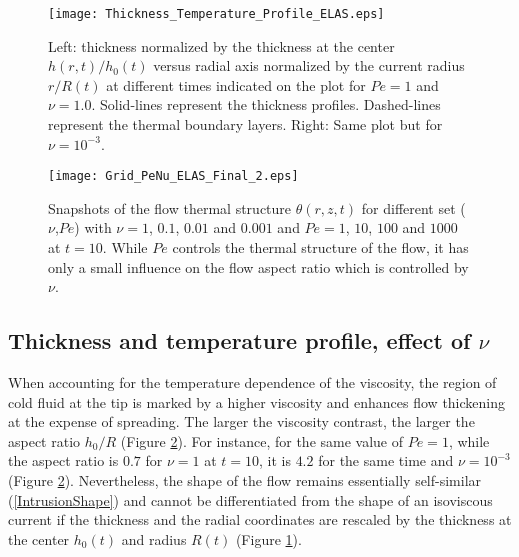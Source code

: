 \begin{figure}
  \begin{center}
    \graphicspath{ {/Users/thorey/Documents/These/Projet/Refroidissement/Skin_Model/Figure/JFM_V13/} }
    \texttt{[image: Thickness\_Temperature\_Profile\_ELAS.eps]}
    \caption{Left: thickness normalized by the thickness at the center
      $h(r,t)/h_0(t)$  versus radial  axis normalized  by the  current
      radius $r/R(t)$  at different  times indicated  on the  plot for
      $Pe=1$   and  $\nu=1.0$.    Solid-lines  represent   the
      thickness profiles.   Dashed-lines represent the thermal
      boundary layers.  Right: Same plot but for $\nu=10^{-3}$.}
    \label{Thickness_Temperature_Profile_ELAS}
  \end{center}
\end{figure}

\begin{figure}
  \begin{center}
    \graphicspath{ {/Users/thorey/Documents/These/Projet/Refroidissement/Skin_Model/Figure/JFM_V13/} }
    \texttt{[image: Grid\_PeNu\_ELAS\_Final\_2.eps]}
    \caption{Snapshots of  the flow thermal  structure $\theta(r,z,t)$
      for different set ($\nu$,$Pe$) with  $\nu= 1$, $0.1$, $0.01$ and
      $0.001$  and $Pe=1$,  $10$, $100$  and $1000$  at $t=10$.  While
      $Pe$ controls the  thermal structure of the flow, it  has only a
      small influence on the flow aspect ratio which is controlled by $\nu$.}
    \label{Grid_PeNu_ELAS}
  \end{center}
\end{figure}

\subsection{Thickness and temperature profile, effect of $\nu$}
\label{sec:thickn-temp-prof-1-e}

When accounting for  the temperature dependence of  the viscosity, the
region of cold  fluid at the tip  is marked by a  higher viscosity and
enhances flow thickening at the  expense of spreading.  The larger the
viscosity  contrast,  the  larger  the aspect  ratio  $h_0/R$  (Figure
\ref{Grid_PeNu_ELAS}).  For  instance, for  the same value  of $Pe=1$,
while the aspect ratio is $0.7$ for $\nu=1$ at $t=10$, it is $4.2$ for
the  same   time  and  $\nu=10^{-3}$   (Figure  \ref{Grid_PeNu_ELAS}).
Nevertheless, the  shape of the flow  remains essentially self-similar
(\ref{IntrusionShape}) and cannot be  differentiated from the shape of
an isoviscous current  if the thickness and the  radial coordinates are
rescaled by  the thickness  at the center  $h_0(t)$ and  radius $R(t)$
(Figure \ref{Thickness_Temperature_Profile_ELAS}).


